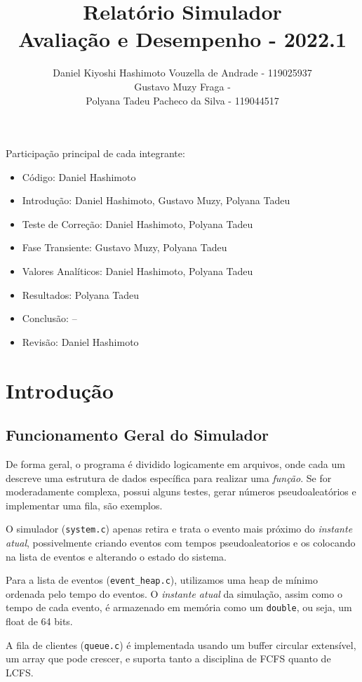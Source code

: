 \documentclass[a4paper]{article}
\title{Relatório Simulador\\
  Avaliação e Desempenho - 2022.1}
\author{Daniel Kiyoshi Hashimoto Vouzella de Andrade - 119025937
  \\
Gustavo Muzy Fraga -
  \\
Polyana Tadeu Pacheco da Silva - 119044517
}
\date{}
\newcommand{\arq}{\texttt}
\newcommand{\inlcode}{\texttt}
\begin{document}
\maketitle

\vfill

Participação principal de cada integrante:
\begin{itemize}
    \item \large Código: 
    \hfill Daniel Hashimoto
    \item \large Introdução: 
    \hfill Daniel Hashimoto, Gustavo Muzy, Polyana Tadeu
    \item \large Teste de Correção: 
    \hfill Daniel Hashimoto, Polyana Tadeu
    \item \large Fase Transiente: 
    \hfill Gustavo Muzy, Polyana Tadeu
    \item \large Valores Analíticos: 
    \hfill Daniel Hashimoto, Polyana Tadeu
    \item \large Resultados: 
    \hfill Polyana Tadeu
    \item \large Conclusão: 
    \hfill --
    \item \large Revisão: 
    \hfill Daniel Hashimoto
\end{itemize}

\newpage
\section{Introdução}
\subsection{Funcionamento Geral do Simulador}
De forma geral,
o programa é dividido logicamente em arquivos,
onde cada um descreve uma estrutura de dados
específica para realizar uma \emph{função}.
Se for moderadamente complexa, possui alguns testes,
gerar números pseudoaleatórios e implementar uma fila,
são exemplos.

O simulador (\arq{system.c})
apenas retira e trata o evento mais próximo do \emph{instante atual},
possivelmente criando eventos com tempos pseudoaleatorios
e os colocando na lista de eventos e alterando o estado do sistema.

Para a lista de eventos (\arq{event\_heap.c}),
utilizamos uma heap de mínimo ordenada pelo tempo do eventos.
O \emph{instante atual} da simulação,
assim como o tempo de cada evento,
é armazenado em memória como um \inlcode{double}, ou seja,
um float de 64 bits.

A fila de clientes (\arq{queue.c})
é implementada usando um buffer circular extensível,
um array que pode crescer,
e suporta tanto a disciplina de FCFS quanto de LCFS.
\end{document}
